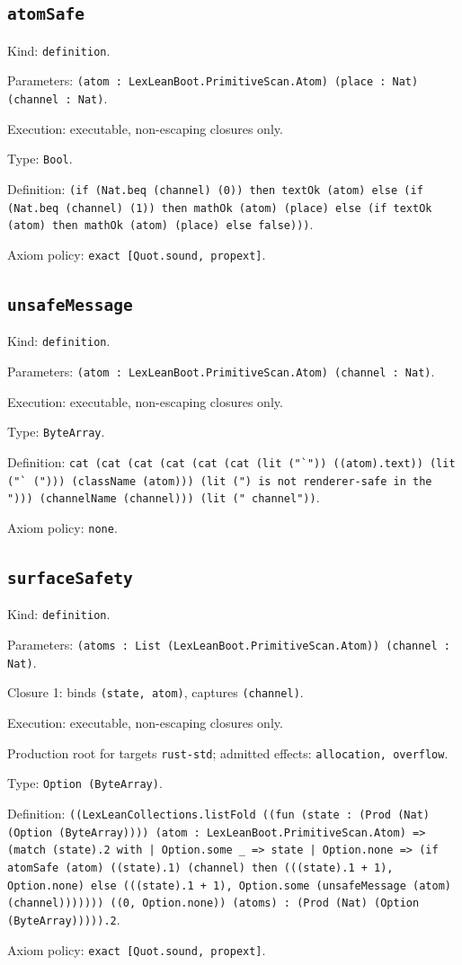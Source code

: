 \documentclass[11pt]{article}
\begin{document}
\subsection*{\texttt{atomSafe}}
\noindent Kind: \texttt{definition}.\par
\noindent Parameters: \texttt{(atom : LexLeanBoot.PrimitiveScan.Atom) (place : Nat) (channel : Nat)}.\par
\noindent Execution: executable, non-escaping closures only.\par
\noindent Type: \texttt{Bool}.\par
\noindent Definition: \texttt{(if (Nat.beq (channel) (0)) then textOk (atom) else (if (Nat.beq (channel) (1)) then mathOk (atom) (place) else (if textOk (atom) then mathOk (atom) (place) else false)))}.\par
\noindent Axiom policy: \texttt{exact [Quot.sound, propext]}.\par
\subsection*{\texttt{unsafeMessage}}
\noindent Kind: \texttt{definition}.\par
\noindent Parameters: \texttt{(atom : LexLeanBoot.PrimitiveScan.Atom) (channel : Nat)}.\par
\noindent Execution: executable, non-escaping closures only.\par
\noindent Type: \texttt{ByteArray}.\par
\noindent Definition: \texttt{cat (cat (cat (cat (cat (cat (lit ("`")) ((atom).text)) (lit ("` ("))) (className (atom))) (lit (") is not renderer-safe in the "))) (channelName (channel))) (lit (" channel"))}.\par
\noindent Axiom policy: \texttt{none}.\par
\subsection*{\texttt{surfaceSafety}}
\noindent Kind: \texttt{definition}.\par
\noindent Parameters: \texttt{(atoms : List (LexLeanBoot.PrimitiveScan.Atom)) (channel : Nat)}.\par
\noindent Closure 1: binds \texttt{(state, atom)}, captures \texttt{(channel)}.\par
\noindent Execution: executable, non-escaping closures only.\par
\noindent Production root for targets \texttt{rust-std}; admitted effects: \texttt{allocation, overflow}.\par
\noindent Type: \texttt{Option (ByteArray)}.\par
\noindent Definition: \texttt{((LexLeanCollections.listFold ((fun (state : (Prod (Nat) (Option (ByteArray)))) (atom : LexLeanBoot.PrimitiveScan.Atom) => (match (state).2 with | Option.some \_ => state | Option.none => (if atomSafe (atom) ((state).1) (channel) then (((state).1 + 1), Option.none) else (((state).1 + 1), Option.some (unsafeMessage (atom) (channel))))))) ((0, Option.none)) (atoms) : (Prod (Nat) (Option (ByteArray))))).2}.\par
\noindent Axiom policy: \texttt{exact [Quot.sound, propext]}.\par
\end{document}
